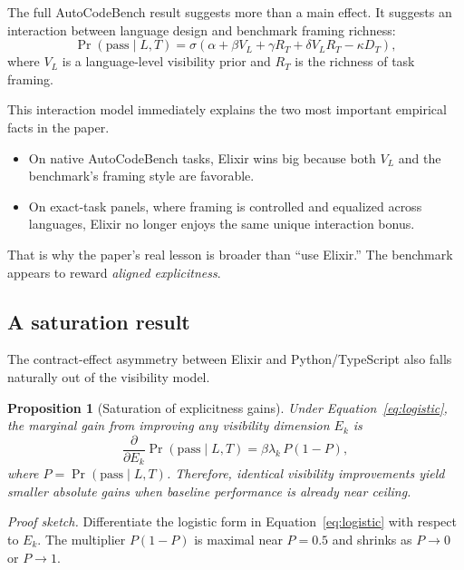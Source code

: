 \documentclass[11pt]{article}
\newtheorem{proposition}{Proposition}
\newcommand{\acb}{AutoCodeBench}
\newcommand{\elixir}{Elixir}
\newcommand{\pythonlang}{Python}
\newcommand{\tslang}{TypeScript}
\begin{document}
The full \acb{} result suggests more than a main effect. It suggests an interaction between language design and benchmark framing richness:
\begin{equation}
\Pr(\mathrm{pass} \mid L,T) =
\sigma\!\left(
\alpha + \beta V_L + \gamma R_T + \delta V_L R_T - \kappa D_T
\right),
\label{eq:interaction}
\end{equation}
where $V_L$ is a language-level visibility prior and $R_T$ is the richness of task framing.

This interaction model immediately explains the two most important empirical facts in the paper.

\begin{itemize}
  \item On native \acb{} tasks, \elixir{} wins big because both $V_L$ and the benchmark's framing style are favorable.
  \item On exact-task panels, where framing is controlled and equalized across languages, \elixir{} no longer enjoys the same unique interaction bonus.
\end{itemize}

That is why the paper's real lesson is broader than ``use \elixir{}.'' The benchmark appears to reward \emph{aligned explicitness}.

\subsection{A saturation result}

The contract-effect asymmetry between \elixir{} and \pythonlang{}/\tslang{} also falls naturally out of the visibility model.

\begin{proposition}[Saturation of explicitness gains]
Under Equation~\eqref{eq:logistic}, the marginal gain from improving any visibility dimension $E_k$ is
\begin{equation}
\frac{\partial}{\partial E_k} \Pr(\mathrm{pass} \mid L,T)
=
\beta \lambda_k \, P(1-P),
\label{eq:derivative}
\end{equation}
where $P = \Pr(\mathrm{pass} \mid L,T)$. Therefore, identical visibility improvements yield smaller absolute gains when baseline performance is already near ceiling.
\end{proposition}

\textit{Proof sketch.} Differentiate the logistic form in Equation~\eqref{eq:logistic} with respect to $E_k$. The multiplier $P(1-P)$ is maximal near $P=0.5$ and shrinks as $P \to 0$ or $P \to 1$.
\end{document}
